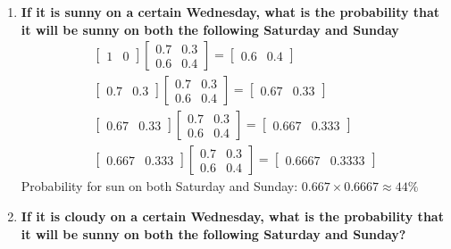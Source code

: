 \documentclass[a4paper]{article}
\begin{document}
\begin{enumerate}
	\item \textbf{If it is sunny on a certain Wednesday, what is the probability that it will be sunny on both the following Saturday and Sunday
	} \\
	\begin{equation}
	\begin{aligned}
	\begin{bmatrix} 1& 0 \end{bmatrix}\begin{bmatrix} 0.7& 0.3 \\ 0.6& 0.4 \end{bmatrix} = \begin{bmatrix} 0.6& 0.4 \end{bmatrix} \\
	\begin{bmatrix} 0.7& 0.3 \end{bmatrix}\begin{bmatrix} 0.7& 0.3 \\ 0.6& 0.4 \end{bmatrix} = \begin{bmatrix} 0.67& 0.33 \end{bmatrix} \\
	\begin{bmatrix} 0.67& 0.33 \end{bmatrix} \begin{bmatrix} 0.7& 0.3 \\ 0.6& 0.4 \end{bmatrix} = \begin{bmatrix} 0.667& 0.333 \end{bmatrix} \\ 
	\begin{bmatrix} 0.667& 0.333 \end{bmatrix} \begin{bmatrix} 0.7& 0.3 \\ 0.6& 0.4 \end{bmatrix} = \begin{bmatrix} 0.6667& 0.3333 \end{bmatrix} 
	\end{aligned}
	\end{equation} 
	Probability for sun on both Saturday and Sunday: $0.667 \times 0.6667 \approx 44\%$

	\item \textbf{ If it is cloudy on a certain Wednesday, what is the probability that it will be sunny on both the following Saturday and Sunday?
	} \\


\end{enumerate}
\end{document}
